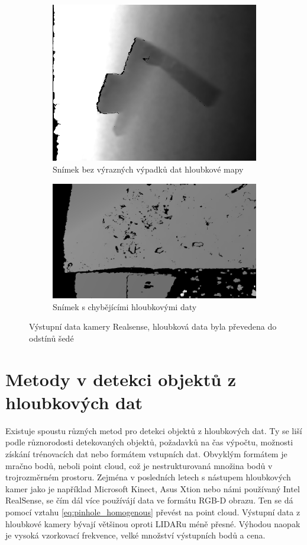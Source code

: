 \documentclass[twoside]{ctuthesis}
\begin{document}
\begin{figure}
\centering
\begin{subfigure}{0.48\textwidth}
  \centering
  \includegraphics[width=0.9\linewidth]{pictures/good_realsense.png}
  \caption{Snímek bez výrazných výpadků dat hloubkové mapy}
  \label{fig:rs_good}
\end{subfigure}
\begin{subfigure}{0.49\textwidth}
  \centering
  \includegraphics[width=0.9\linewidth]{pictures/bad_realsense.png}
  \caption{Snímek s chybějícími hloubkovými daty}
  \label{fig:rs_bad}
\end{subfigure}
\caption{Výstupní data kamery Realsense, hloubková data byla převedena do odstínů šedé}
\label{fig:realsense_pics}
\end{figure}

\chapter{Metody v detekci objektů z hloubkových dat}
\label{sec:Metody_detekce}
Existuje spoustu různých metod pro detekci objektů z hloubkových dat. Ty se liší podle různorodosti detekovaných objektů, požadavků na čas výpočtu, možnosti získání trénovacích dat nebo formátem vstupních dat. Obvyklým formátem je mračno bodů, neboli point cloud, což je nestrukturovaná množina bodů v trojrozměrném prostoru. Zejména v posledních letech s nástupem hloubkových kamer jako je například Microsoft Kinect, Asus Xtion nebo námi používaný Intel RealSense, se čím dál více používájí data ve formátu RGB-D obrazu. Ten se dá pomocí vztahu \ref{eq:pinhole_homogenous} převést na point cloud. Výstupní data z hloubkové kamery bývají většinou oproti LIDARu méně přesné. Výhodou naopak je vysoká vzorkovací frekvence, velké množství výstupních bodů a cena.
\end{document}
